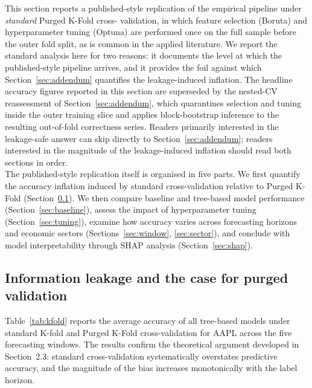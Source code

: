 \documentclass{rQUF2e}
\begin{document}
This section reports a published-style replication of the
empirical pipeline under \emph{standard} Purged K-Fold cross-
validation, in which feature selection (Boruta) and hyperparameter
tuning (Optuna) are performed once on the full sample before the
outer fold split, as is common in the applied literature. We
report the standard analysis here for two reasons: it documents
the level at which the published-style pipeline arrives, and it
provides the foil against which Section~\ref{sec:addendum}
quantifies the leakage-induced inflation. The headline accuracy
figures reported in this section are superseded by the
nested-CV reassessment of Section~\ref{sec:addendum}, which
quarantines selection and tuning inside the outer training slice
and applies block-bootstrap inference to the resulting
out-of-fold correctness series. Readers primarily interested in
the leakage-safe answer can skip directly to
Section~\ref{sec:addendum}; readers interested in the magnitude
of the leakage-induced inflation should read both sections in
order. \\

\noindent The published-style replication itself is organised
in five parts. We first quantify the accuracy inflation induced
by standard cross-validation relative to Purged K-Fold
(Section~\ref{sec:leakage}). We then compare baseline and
tree-based model performance (Section~\ref{sec:baseline}),
assess the impact of hyperparameter tuning
(Section~\ref{sec:tuning}), examine how accuracy varies across
forecasting horizons and economic sectors
(Sections~\ref{sec:window}, \ref{sec:sector}), and conclude
with model interpretability through SHAP analysis
(Section~\ref{sec:shap}).

\subsection{Information leakage and the case for purged validation}
\label{sec:leakage}

Table~\ref{tab:kfold} reports the average accuracy of all tree-based models under standard K-fold and Purged K-Fold cross-validation for AAPL across the five forecasting windows. The results confirm the theoretical argument developed in Section~2.3: standard cross-validation systematically overstates predictive accuracy, and the magnitude of the bias increases monotonically with the label horizon.
\end{document}
